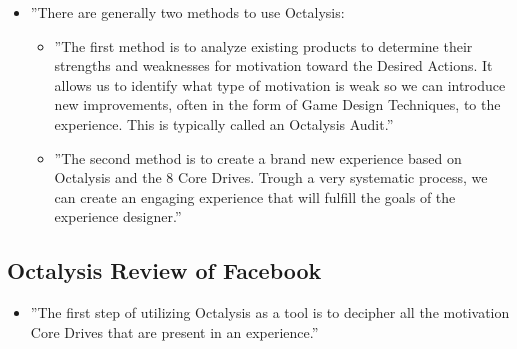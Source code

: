 \begin{itemize}
    \item ''There are generally two methods to use Octalysis:
    \begin{itemize}
        \item ''The first method is to analyze existing products to determine their strengths and weaknesses for motivation toward the Desired Actions. It allows us to identify what type of motivation is weak so we can introduce new improvements, often in the form of Game Design Techniques, to the experience. This is typically called an Octalysis Audit.''
        \item ''The second method is to create a brand new experience based on Octalysis and the 8 Core Drives. Trough a very systematic process, we can create an engaging experience that will fulfill the goals of the experience designer.''
    \end{itemize}
\end{itemize}

\subsection{Octalysis Review of Facebook}
\begin{itemize}
    \item ''The first step of utilizing Octalysis as a tool is to decipher all the motivation Core Drives that are present in an experience.''
\end{itemize}

